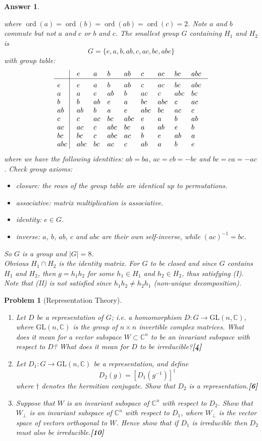 \documentclass[a4paper]{article}
\DeclareMathOperator{\ord}{ord}
\newtheorem{ans}{Answer}[section]
\theoremstyle{new}
\newtheorem{qns}{Problem}[section]
\begin{document}
\begin{ans}
\begin{enumerate}[label=(\alph*)]
where $\ord(a)=\ord(b)=\ord(ab)=\ord(c)=2$. Note $a$ and $b$ commute but not $a$ and $c$ or $b$ and $c$. The smallest group $G$ containing $H_1$ and $H_2$ is 
$$G=\{e,a,b,ab,c,ac,bc,abc\}$$
with group table:
$$\vbox{\tabskip0.5em\offinterlineskip
    \halign{\strut$#$\hfil\ \tabskip1em\vrule&&$#$\hfil\cr
    ~&e&a&b&ab & c & ac & bc & abc   \cr
    \noalign{\hrule}\vrule height 12pt width 0pt
     e&e&a&b&ab & c & ac & bc & abc   \cr
     a & a& e&ab& b&ac&c&abc&bc \cr
     b & b &ab&e&a&bc&abc&c&ac \cr
     ab & ab&b&a&e&abc&bc&ac&c\cr
     c & c & ac & bc & abc & e & a &b & ab \cr
     ac & ac & c & abc & bc & a & ab & e & b \cr
     bc & bc & c & abc & ac & b & e &ab &a \cr
     abc & abc & bc & ac & c & ab & a & b &e \cr
}}$$
where we have the following identities: $ab=ba$, $ac=cb=-bc$ and $bc=ca=-ac$. Check group axioms:
\begin{itemize}
    \item closure: the rows of the group table are identical up to permutations.
    \item associative: matrix multiplication is associative.
    \item identity: $e\in G$.
    \item inverse: $a$, $b$, $ab$, $c$ and $abc$ are their own self-inverse, while $(ac)^{-1}=bc$.
\end{itemize}
So $G$ is a group and $|G|=8$.\\[5pt]
Obvious $H_1\cap H_2$ is the identity matrix. For $G$ to be closed and since $G$ contains $H_1$ and $H_2$, then $g=h_1h_2$ for some $h_1\in H_1$ and $h_2\in H_2$, thus satisfying (I). Note that (II) is not satisfied since $h_1h_2\neq h_2h_1$ (non-unique decomposition).
\end{enumerate}
\end{ans}
\begin{qns}[Representation Theory]\leavevmode
\begin{enumerate}[label=(\alph*)]
\item Let $D$ be a representation of $G$; i.e. a homomorphism $D : G\rightarrow \text{GL}(n,\mathbb{C})$, where $\text{GL}(n,\mathbb{C})$ is the group of $n\times n$ invertible complex matrices. What does it mean for a vector subspace $W\subset\mathbb{C}^n$ to be an invariant subspace with respect to $D$? What does it mean for $D$ to be irreducible?\hfill\textbf{[4]}
\item Let $D_1 : G \rightarrow\text{GL}(n,\mathbb{C})$ be a representation, and define 
$$D_2(g) = [D_1(g^{−1})]^\dag$$
where $\dag$ denotes the hermitian conjugate. Show that $D_2$ is a representation.\hfill\textbf{[6]}
\item Suppose that $W$ is an invariant subspace of $\mathbb{C}^n$ with respect to $D_2$. Show that $W_\perp$ is an invariant subspace of $\mathbb{C}^n$ with respect to $D_1$, where $W_\perp$ is the vector space of vectors orthogonal to $W$. Hence show that if $D_1$ is irreducible then $D_2$ must also be irreducible.\hfill\textbf{[10]}
\end{enumerate}
\end{qns}
\end{document}
